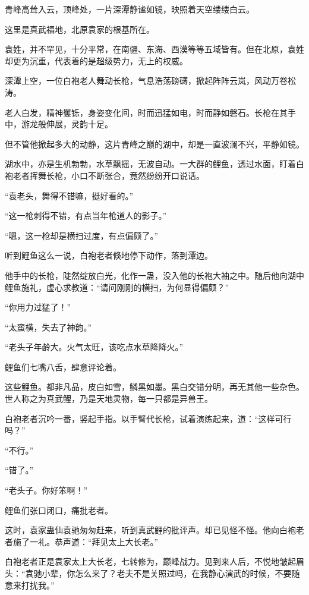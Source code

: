 
\begin{this_body}

青峰高耸入云，顶峰处，一片深潭静谧如镜，映照着天空缕缕白云。

这里是真武福地，北原袁家的根基所在。

袁姓，并不罕见，十分平常，在南疆、东海、西漠等等五域皆有。但在北原，袁姓却更为沉重，代表着的是超级势力，无上的权威。

深潭上空，一位白袍老人舞动长枪，气息浩荡磅礴，掀起阵阵云岚，风动万卷松涛。

老人白发，精神矍铄，身姿变化间，时而迅猛如电，时而静如磐石。长枪在其手中，游龙般伸展，灵韵十足。

但不管他掀起多大的动静，这片青峰之巅的湖中，却是一直波澜不兴，平静如镜。

湖水中，亦是生机勃勃，水草飘摇，无波自动。一大群的鲤鱼，透过水面，盯着白袍老者挥舞长枪，小口不断张合，竟然纷纷开口说话。

“袁老头，舞得不错嘛，挺好看的。”

“这一枪刺得不错，有点当年枪道人的影子。”

“嗯，这一枪却是横扫过度，有点偏颇了。”

听到鲤鱼这么一说，白袍老者倏地停下动作，落到潭边。

他手中的长枪，陡然绽放白光，化作一蛊，没入他的长袍大袖之中。随后他向湖中鲤鱼施礼，虚心求教道：“请问刚刚的横扫，为何显得偏颇？”

“你用力过猛了！”

“太蛮横，失去了神韵。”

“老头子年龄大。火气太旺，该吃点水草降降火。”

鲤鱼们七嘴八舌，肆意评论着。

这些鲤鱼。都非凡品，皮白如雪，鳞黑如墨。黑白交错分明，再无其他一些杂色。世人称之为真武鲤，乃是天地灵物，每一只都是异兽王。

白袍老者沉吟一番，竖起手指。以手臂代长枪，试着演练起来，道：“这样可行吗？”

“不行。”

“错了。”

“老头子。你好笨啊！”

鲤鱼们张口闭口，痛批老者。

这时，袁家蛊仙袁驰匆匆赶来，听到真武鲤的批评声。却已见怪不怪。他向白袍老者施了一礼。恭声道：“拜见太上大长老。”

白袍老者正是袁家太上大长老，七转修为，巅峰战力。见到来人后，不悦地皱起眉头：“袁驰小辈，你怎么来了？老夫不是关照过吗，在我静心演武的时候，不要随意来打扰我。”


\end{this_body}
